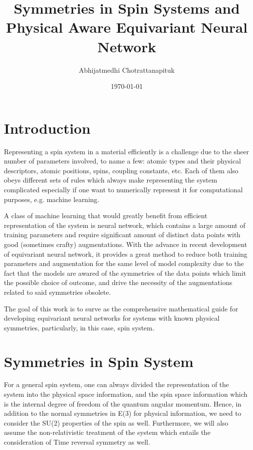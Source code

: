 \documentclass[reprint, 10pt]{revtex4-2}
\begin{document}
\title{Symmetries in Spin Systems and Physical Aware Equivariant Neural Network}
\author{Abhijatmedhi Chotrattanapituk}

\date{\today}

\maketitle
\section{Introduction}
Representing a spin system in a material efficiently is a challenge due to the sheer number of parameters involved, 
to name a few: atomic types and their physical descriptors, atomic positions, spins, coupling constants, etc. 
Each of them also obeys different sets of rules which always make representing the system complicated especially
if one want to numerically represent it for computational purposes, e.g. machine learning.

A class of machine learning that would greatly benefit from efficient representation of the system is neural network,
which contains a large amount of training parameters and require significant amount of distinct data points with 
good (sometimes crafty) augmentations. With the advance in recent development of equivariant neural network, it provides
a great method to reduce both training parameters and augmentation for the same level of model complexity due to the
fact that the models are awared of the symmetries of the data points which limit the possible choice of outcome,
and drive the necessity of the augmentations related to said symmetries obsolete.

The goal of this work is to surve as the comprehensive mathematical guide for developing equivariant neural networks 
for systems with known physical symmetries, particularly, in this case, spin system.

\section{Symmetries in Spin System}
For a general spin system, one can always divided the representation of the system into the physical space information,
and the spin space information which is the internal degree of freedom of the quantum angular momentum. Hence, in addition
to the normal symmetries in E(3) for physical information, we need to consider the SU(2) properties of the spin as well.
Furthermore, we will also assume the non-relativistic treatment of the system which entails the consideration of Time
reversal symmetry as well.
\end{document}
